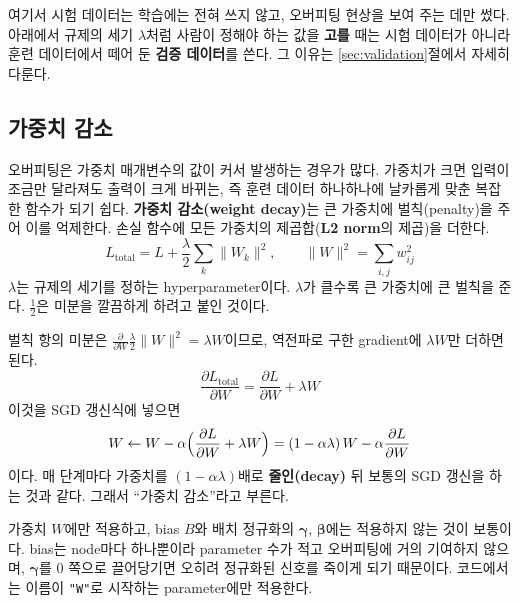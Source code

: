 \documentclass[11pt,a4paper]{article}
\newcommand{\pd}[2]{\frac{\partial #1}{\partial #2}}
\begin{document}
\begin{thinkbox}[시험 데이터의 역할]
여기서 시험 데이터는 학습에는 전혀 쓰지 않고, 오버피팅 현상을 보여 주는 데만 썼다.
아래에서 규제의 세기 $\lambda$처럼 사람이 정해야 하는 값을 \textbf{고를} 때는
시험 데이터가 아니라 훈련 데이터에서 떼어 둔 \textbf{검증 데이터}를 쓴다.
그 이유는 \ref{sec:validation}절에서 자세히 다룬다.
\end{thinkbox}

\subsection{가중치 감소}\label{sec:weightdecay}

오버피팅은 가중치 매개변수의 값이 커서 발생하는 경우가 많다.
가중치가 크면 입력이 조금만 달라져도 출력이 크게 바뀌는,
즉 훈련 데이터 하나하나에 날카롭게 맞춘 복잡한 함수가 되기 쉽다.
\textbf{가중치 감소(weight decay)}는 큰 가중치에 벌칙(penalty)을 주어 이를 억제한다.
손실 함수에 모든 가중치의 제곱합(\textbf{L2 norm}의 제곱)을 더한다.
\[
L_{\text{total}}=L+\frac{\lambda}{2}\sum_{k}\lVert W_k\rVert^2,
\qquad \lVert W\rVert^2=\sum_{i,j}w_{ij}^2
\]
$\lambda$는 규제의 세기를 정하는 hyperparameter이다. $\lambda$가 클수록 큰 가중치에 큰 벌칙을 준다.
$\frac12$은 미분을 깔끔하게 하려고 붙인 것이다.

벌칙 항의 미분은 $\pd{}{W}\frac\lambda2\lVert W\rVert^2=\lambda W$이므로,
역전파로 구한 gradient에 $\lambda W$만 더하면 된다.
\[
\pd{L_{\text{total}}}{W}=\pd{L}{W}+\lambda W
\]
이것을 SGD 갱신식에 넣으면
\[
W\leftarrow W-\alpha\Bigl(\pd{L}{W}+\lambda W\Bigr)
=(1-\alpha\lambda)\,W-\alpha\pd{L}{W}
\]
이다. 매 단계마다 가중치를 $(1-\alpha\lambda)$배로 \textbf{줄인(decay)} 뒤 보통의 SGD 갱신을 하는 것과 같다.
그래서 ``가중치 감소''라고 부른다.

\begin{remarkbox}
가중치 $W$에만 적용하고, bias $B$와 배치 정규화의 $\bm\gamma$, $\bm\beta$에는 적용하지 않는 것이 보통이다.
bias는 node마다 하나뿐이라 parameter 수가 적고 오버피팅에 거의 기여하지 않으며,
$\bm\gamma$를 $0$ 쪽으로 끌어당기면 오히려 정규화된 신호를 죽이게 되기 때문이다.
코드에서는 이름이 \texttt{"W"}로 시작하는 parameter에만 적용한다.
\end{remarkbox}
\end{document}

